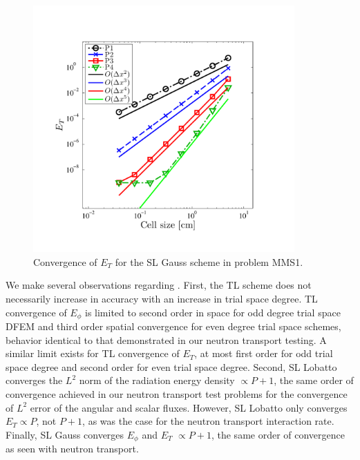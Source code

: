 \begin{figure}[!hbp]
\centering
\includegraphics[width=10cm,trim=0.25in  0.5in 0.75in 0.75in,clip=true]{chapter6_grey_radtran/Dissertation_Data/MMS2_SLXS_Gauss_temp_L2.pdf}
\caption{Convergence of $E_{T}$ for the SL Gauss scheme in problem MMS1.}
\label{fig:mms1_gauss_temp}
\end{figure}

We make several observations regarding .  
First, the TL scheme does not necessarily increase in accuracy with an increase in trial space degree.
TL convergence of $E_{\phi}$ is limited to second order in space for odd degree trial space DFEM and third order spatial convergence for even degree trial space schemes, behavior identical to that demonstrated in our neutron transport testing.
A similar limit exists for TL convergence of $E_T$, at most first order for odd trial space degree and second order for even trial space degree.
Second, SL Lobatto converges the $L^2$ norm of the radiation energy density $\propto P+1$, the same order of convergence achieved in our neutron transport test problems for the convergence of $L^2$ error of the angular and scalar fluxes.
However, SL Lobatto only converges $E_T \propto P$, not $P+1$, as was the case for the neutron transport interaction rate.
Finally, SL Gauss converges $E_{\phi}$ and $E_T$ $\propto P+1$, the same order of convergence as seen with neutron transport.

